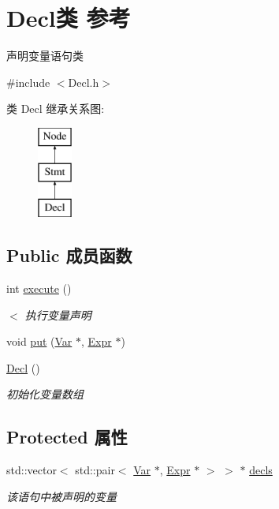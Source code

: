 \hypertarget{class_decl}{}\section{Decl类 参考}
\label{class_decl}


声明变量语句类  




{\ttfamily \#include $<$Decl.\+h$>$}

类 Decl 继承关系图\+:\begin{figure}[H]
\begin{center}
\leavevmode
\includegraphics[height=3.000000cm]{class_decl}
\end{center}
\end{figure}
\subsection*{Public 成员函数}
\begin{DoxyCompactItemize}
\item 
\mbox{\label{class_decl_ad6495a4245a45dcdcd05e239c8db4a8b}} 
int \hyperlink{class_decl_ad6495a4245a45dcdcd05e239c8db4a8b}{execute} ()
\begin{DoxyCompactList}\small\item\em $<$ 执行变量声明 \end{DoxyCompactList}\item 
void \hyperlink{class_decl_a4c91db9c289b90f3045783f6bf53a688}{put} (\hyperlink{class_var}{Var} $\ast$, \hyperlink{class_expr}{Expr} $\ast$)
\item 
\mbox{\label{class_decl_a356b82bee7d66a98c8fbb3547836b785}} 
\hyperlink{class_decl_a356b82bee7d66a98c8fbb3547836b785}{Decl} ()
\begin{DoxyCompactList}\small\item\em 初始化变量数组 \end{DoxyCompactList}\end{DoxyCompactItemize}
\subsection*{Protected 属性}
\begin{DoxyCompactItemize}
\item 
\mbox{\label{class_decl_a7e84697f4d13126d1234a49b68af7eeb}} 
std\+::vector$<$ std\+::pair$<$ \hyperlink{class_var}{Var} $\ast$, \hyperlink{class_expr}{Expr} $\ast$ $>$ $>$ $\ast$ \hyperlink{class_decl_a7e84697f4d13126d1234a49b68af7eeb}{decls}
\begin{DoxyCompactList}\small\item\em 该语句中被声明的变量 \end{DoxyCompactList}\end{DoxyCompactItemize}
